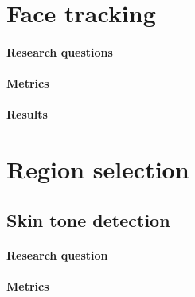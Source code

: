 \section{Face tracking}
\label{section:face_tracking}
\paragraph{Research questions}
\paragraph{Metrics}
\paragraph{Results}


\section{Region selection}
\label{section:region_selection}
\subsection{Skin tone detection}
\label{section:skin_tone_detection}
\paragraph{Research question}

\paragraph{Metrics}
